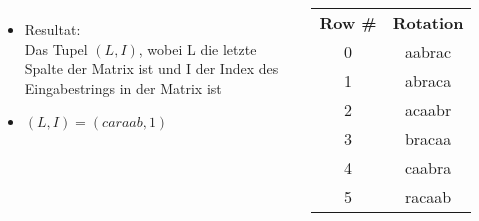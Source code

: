 \documentclass[14pt,xcolor=dvipsnames]{beamer}
\begin{document}
\begin{frame}[allowframebreaks]
\begin{columns}[c,onlytextwidth]
 \begin{itemize}
  \item Resultat:\\
      Das Tupel \textit{$(L,I)$}, wobei L die {\color{red}letzte Spalte} der Matrix ist
      und I der Index des {\color{darkgreen}Eingabestrings in der Matrix} ist
  \item $(L,I) = (caraab, 1)$
 \end{itemize}
    \begin{tabular}{c|c}
    \textbf{Row \#} & \textbf{Rotation} \\
    0 & aabra{\color{red}c} \\
    {\color{darkgreen}1} & {\color{darkgreen}abrac}{\color{red}a} \\
    2 & acaab{\color{red}r} \\
    3 & braca{\color{red}a} \\
    4 & caabr{\color{red}a} \\
    5 & racaa{\color{red}b} \\
    \end{tabular}
\end{columns}
\end{frame}
\end{document}
